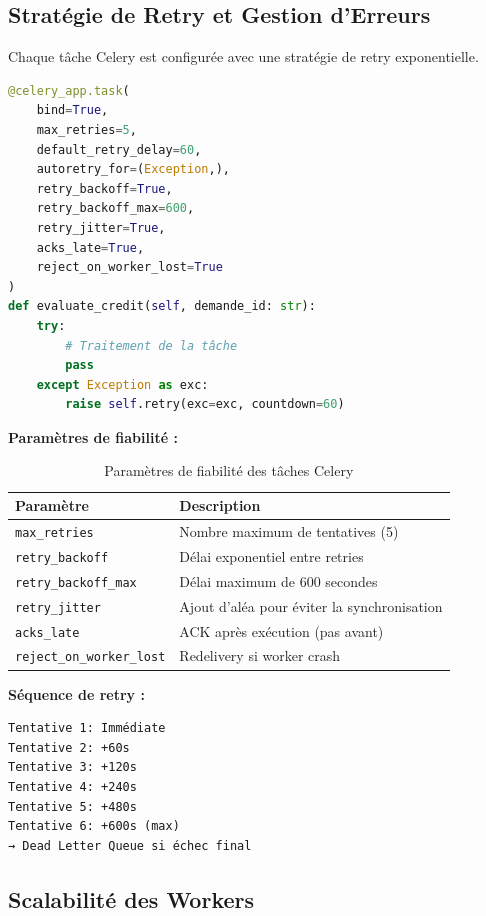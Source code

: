 \documentclass[12pt,a4paper]{article}
\begin{document}
\subsection{Stratégie de Retry et Gestion d'Erreurs}

Chaque tâche Celery est configurée avec une stratégie de retry exponentielle.

\begin{lstlisting}[language=Python]
@celery_app.task(
    bind=True,
    max_retries=5,
    default_retry_delay=60,
    autoretry_for=(Exception,),
    retry_backoff=True,
    retry_backoff_max=600,
    retry_jitter=True,
    acks_late=True,
    reject_on_worker_lost=True
)
def evaluate_credit(self, demande_id: str):
    try:
        # Traitement de la tâche
        pass
    except Exception as exc:
        raise self.retry(exc=exc, countdown=60)
\end{lstlisting}

\textbf{Paramètres de fiabilité :}

\begin{table}[H]
\centering
\begin{tabular}{lp{8cm}}
\toprule
\textbf{Paramètre} & \textbf{Description} \\
\midrule
\texttt{max\_retries} & Nombre maximum de tentatives (5) \\
\texttt{retry\_backoff} & Délai exponentiel entre retries \\
\texttt{retry\_backoff\_max} & Délai maximum de 600 secondes \\
\texttt{retry\_jitter} & Ajout d'aléa pour éviter la synchronisation \\
\texttt{acks\_late} & ACK après exécution (pas avant) \\
\texttt{reject\_on\_worker\_lost} & Redelivery si worker crash \\
\bottomrule
\end{tabular}
\caption{Paramètres de fiabilité des tâches Celery}
\end{table}

\textbf{Séquence de retry :}

\begin{verbatim}
Tentative 1: Immédiate
Tentative 2: +60s
Tentative 3: +120s
Tentative 4: +240s
Tentative 5: +480s
Tentative 6: +600s (max)
→ Dead Letter Queue si échec final
\end{verbatim}

\subsection{Scalabilité des Workers}
\end{document}
